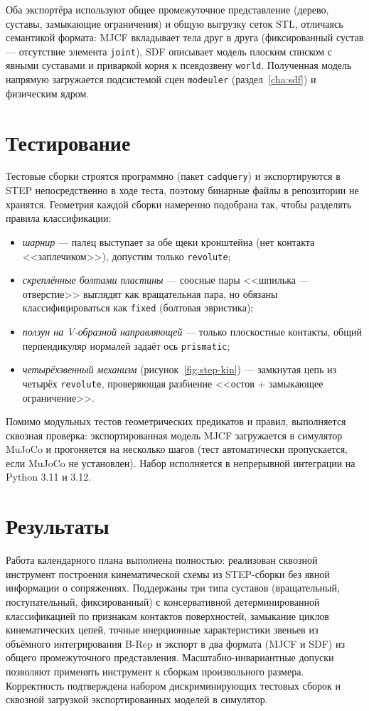 Оба экспортёра используют общее промежуточное представление (дерево, суставы,
замыкающие ограничения) и общую выгрузку сеток STL, отличаясь семантикой
формата: MJCF вкладывает тела друг в друга (фиксированный сустав --- отсутствие
элемента \texttt{joint}), SDF описывает модель плоским списком с явными
суставами и приваркой корня к псевдозвену \texttt{world}. Полученная модель
напрямую загружается подсистемой сцен \texttt{modeuler} (раздел~\ref{cha:sdf})
и физическим ядром.

\section{Тестирование}

Тестовые сборки строятся программно (пакет \texttt{cadquery}) и экспортируются
в STEP непосредственно в ходе теста, поэтому бинарные файлы в репозитории не
хранятся. Геометрия каждой сборки намеренно подобрана так, чтобы разделять
правила классификации:
\begin{itemize}
  \item \emph{шарнир} --- палец выступает за обе щеки кронштейна (нет контакта
        <<заплечиком>>), допустим только \texttt{revolute};
  \item \emph{скреплённые болтами пластины} --- соосные пары <<шпилька ---
        отверстие>> выглядят как вращательная пара, но обязаны
        классифицироваться как \texttt{fixed} (болтовая эвристика);
  \item \emph{ползун на V-образной направляющей} --- только плоскостные
        контакты, общий перпендикуляр нормалей задаёт ось \texttt{prismatic};
  \item \emph{четырёхзвенный механизм} (рисунок~\ref{fig:step-kin}) ---
        замкнутая цепь из четырёх \texttt{revolute}, проверяющая разбиение
        <<остов + замыкающее ограничение>>.
\end{itemize}
Помимо модульных тестов геометрических предикатов и правил, выполняется
сквозная проверка: экспортированная модель MJCF загружается в симулятор MuJoCo
и прогоняется на несколько шагов (тест автоматически пропускается, если MuJoCo
не установлен). Набор исполняется в непрерывной интеграции на Python 3.11 и
3.12.

\section{Результаты}

Работа календарного плана выполнена полностью: реализован сквозной инструмент
построения кинематической схемы из STEP-сборки без явной информации о
сопряжениях. Поддержаны три типа суставов (вращательный, поступательный,
фиксированный) с консервативной детерминированной классификацией по признакам
контактов поверхностей, замыкание циклов кинематических цепей, точные
инерционные характеристики звеньев из объёмного интегрирования B-Rep и экспорт
в два формата (MJCF и SDF) из общего промежуточного представления.
Масштабно-инвариантные допуски позволяют применять инструмент к сборкам
произвольного размера. Корректность подтверждена набором дискриминирующих
тестовых сборок и сквозной загрузкой экспортированных моделей в симулятор.
